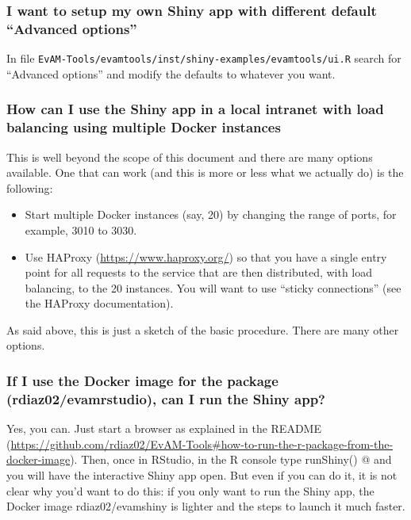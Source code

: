 \documentclass[a4paper,11pt]{article}
\begin{document}
\subsubsection{I want to setup my own Shiny app with different default ``Advanced options''}

In file \texttt{EvAM-Tools/evamtools/inst/shiny-examples/evamtools/ui.R} search for ``Advanced options'' and modify the defaults to whatever you want.


\subsubsection{How can I use the Shiny app in a local intranet with load balancing using multiple Docker instances}
\label{haproxy}

This is well beyond the scope of this document and there are many options available. One that can work (and this is more or less what we actually do) is the following:

\begin{itemize}
\item Start multiple Docker instances (say, 20) by changing the range of ports, for example, 3010 to 3030.
\item Use HAProxy (\url{https://www.haproxy.org/}) so that you have a single entry point for all requests to the service that are then distributed, with load balancing, to the 20 instances. You will want to use ``sticky connections'' (see the HAProxy documentation).
\end{itemize}

As said above, this is just a sketch of the basic procedure. There are many other options.


\subsubsection{If I use the Docker image for the package (rdiaz02/evamrstudio), can I run the Shiny app?}

Yes, you can. Just start a browser as explained in the README (\url{https://github.com/rdiaz02/EvAM-Tools#how-to-run-the-r-package-from-the-docker-image}). Then, once in RStudio, in the R console type \verb@ runShiny() @ and you will have the interactive Shiny app open. But even if you can do it, it is not clear why you'd want to do this: if you only want to run the Shiny app, the Docker image rdiaz02/evamshiny is lighter and the steps to launch it much faster.
\end{document}
